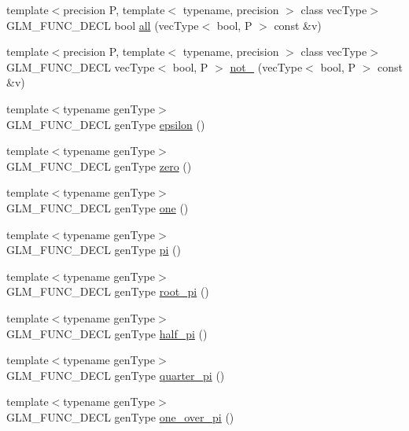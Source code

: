 \begin{CompactItemize}
\item 
{\footnotesize template$<$precision P, template$<$ typename, precision $>$ class vecType$>$ }\\GLM\_\-FUNC\_\-DECL bool \hyperlink{group__core__func__vector__relational_gabd60ec747e12c78e2d5c6e6c2ede230}{all} (vecType$<$ bool, P $>$ const \&v)
\item 
{\footnotesize template$<$precision P, template$<$ typename, precision $>$ class vecType$>$ }\\GLM\_\-FUNC\_\-DECL vecType$<$ bool, P $>$ \hyperlink{group__core__func__vector__relational_g3f686b22d487d7d06447b15d3c621d2f}{not\_\-} (vecType$<$ bool, P $>$ const \&v)
\item 
{\footnotesize template$<$typename genType$>$ }\\GLM\_\-FUNC\_\-DECL genType \hyperlink{group__gtc__constants_g136c74927d8ab624f3c008bcd8c4445b}{epsilon} ()
\item 
{\footnotesize template$<$typename genType$>$ }\\GLM\_\-FUNC\_\-DECL genType \hyperlink{group__gtc__constants_g888d199297a924864bc2235f5133c30f}{zero} ()
\item 
{\footnotesize template$<$typename genType$>$ }\\GLM\_\-FUNC\_\-DECL genType \hyperlink{group__gtc__constants_gbc71dfc97639e8010a39c1892e68ed9b}{one} ()
\item 
{\footnotesize template$<$typename genType$>$ }\\GLM\_\-FUNC\_\-DECL genType \hyperlink{group__gtc__constants_g7e73289d56099ea4789c597750dc68b8}{pi} ()
\item 
{\footnotesize template$<$typename genType$>$ }\\GLM\_\-FUNC\_\-DECL genType \hyperlink{group__gtc__constants_g94ccd058b697006c9aacc2329edc05a0}{root\_\-pi} ()
\item 
{\footnotesize template$<$typename genType$>$ }\\GLM\_\-FUNC\_\-DECL genType \hyperlink{group__gtc__constants_gac1d3ec09335dd506ecc76a0097db220}{half\_\-pi} ()
\item 
{\footnotesize template$<$typename genType$>$ }\\GLM\_\-FUNC\_\-DECL genType \hyperlink{group__gtc__constants_g42880986550674518989d057ee8b6407}{quarter\_\-pi} ()
\item 
{\footnotesize template$<$typename genType$>$ }\\GLM\_\-FUNC\_\-DECL genType \hyperlink{group__gtc__constants_gcbd54875746accf5c4c5a52582c8d764}{one\_\-over\_\-pi} ()

\end{CompactItemize}
